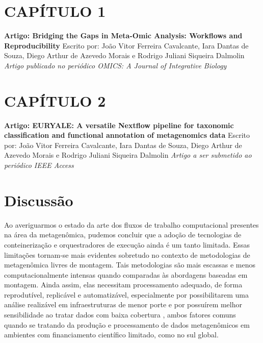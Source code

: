 \documentclass[
	12pt,				%
	oneside,			%
	a4paper,			%
	chapter=TITLE,		%
	section=TITLE,		%
	english,			%
	brazil				%
	]{abntex2}
\begin{document}
\chapter*{CAPÍTULO 1}\label{cap1}
\begin{center}
\textbf{Artigo: Bridging the Gaps in Meta-Omic Analysis: Workflows and Reproducibility}
\bigskip\newline
Escrito por: João Vitor Ferreira Cavalcante, Iara Dantas de Souza, Diego Arthur de Azevedo Morais e Rodrigo Juliani Siqueira Dalmolin
\bigskip\newline
\textit{Artigo publicado no periódico OMICS: A Journal of Integrative Biology}

\end{center}
\begin{fichacatalografica}
    
\end{fichacatalografica}
\chapter*{CAPÍTULO 2}\label{cap2}
\begin{center}
\textbf{Artigo: EURYALE: A versatile Nextflow pipeline for taxonomic classification and functional annotation of metagenomics data}
\bigskip\newline
Escrito por: João Vitor Ferreira Cavalcante, Iara Dantas de Souza, Diego Arthur de Azevedo Morais e Rodrigo Juliani Siqueira Dalmolin
\bigskip\newline
\textit{Artigo a ser submetido ao periódico IEEE Access}

\end{center}
\begin{fichacatalografica}
    
\end{fichacatalografica}
\chapter{Discussão}\label{discussuxe3o}

Ao averiguarmos o estado da arte dos fluxos de trabalho computacional presentes na área da metagenômica, pudemos concluir que a adoção de tecnologias de conteinerização e orquestradores de execução ainda é um tanto limitada. Essas limitações tornam-se mais evidentes sobretudo no contexto de metodologias de metagenômica livres de montagem. Tais metodologias são mais escassas e menos computacionalmente intensas quando comparadas às abordagens baseadas em montagem. Ainda assim, elas necessitam processamento adequado, de forma reprodutível, replicável e automatizável, especialmente por possibilitarem uma análise realizável em infraestruturas de menor porte e por possuírem melhor sensibilidade ao tratar dados com baixa cobertura \autocite{ayling2020}, ambos fatores comuns quando se tratando da produção e processamento de dados metagenômicos em ambientes com financiamento científico limitado, como no sul global.
\end{document}
